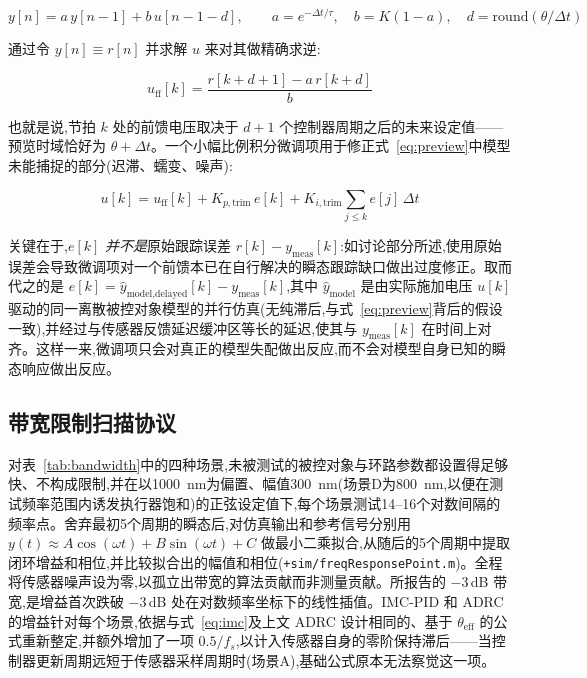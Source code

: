 \documentclass[fleqn,10pt]{wlscirep}
\begin{document}
\begin{equation}
y[n] = a\,y[n-1] + b\,u[n-1-d], \qquad a = e^{-\Delta t/\tau}, \quad b = K(1-a), \quad d = \mathrm{round}(\theta/\Delta t)
\end{equation}

通过令 $y[n] \equiv r[n]$ 并求解 $u$ 来对其做精确求逆:

\begin{equation}
u_\text{ff}[k] = \frac{r[k+d+1] - a\,r[k+d]}{b}
\label{eq:preview}
\end{equation}

也就是说,节拍 $k$ 处的前馈电压取决于 $d+1$ 个控制器周期之后的未来设定值——预览时域恰好为 $\theta + \Delta t$。一个小幅比例积分微调项用于修正式~\ref{eq:preview}中模型未能捕捉的部分(迟滞、蠕变、噪声):

\begin{equation}
u[k] = u_\text{ff}[k] + K_{p,\text{trim}}\,e[k] + K_{i,\text{trim}}\!\!\sum_{j\le k} e[j]\,\Delta t
\end{equation}

关键在于,$e[k]$ \emph{并不是}原始跟踪误差 $r[k]-y_\text{meas}[k]$:如讨论部分所述,使用原始误差会导致微调项对一个前馈本已在自行解决的瞬态跟踪缺口做出过度修正。取而代之的是 $e[k] = \hat{y}_\text{model,delayed}[k] - y_\text{meas}[k]$,其中 $\hat{y}_\text{model}$ 是由实际施加电压 $u[k]$ 驱动的同一离散被控对象模型的并行仿真(无纯滞后,与式~\ref{eq:preview}背后的假设一致),并经过与传感器反馈延迟缓冲区等长的延迟,使其与 $y_\text{meas}[k]$ 在时间上对齐。这样一来,微调项只会对真正的模型失配做出反应,而不会对模型自身已知的瞬态响应做出反应。

\subsection*{带宽限制扫描协议}

对表~\ref{tab:bandwidth}中的四种场景,未被测试的被控对象与环路参数都设置得足够快、不构成限制,并在以\SI{1000}{nm}为偏置、幅值\SI{300}{nm}(场景D为\SI{800}{nm},以便在测试频率范围内诱发执行器饱和)的正弦设定值下,每个场景测试14--16个对数间隔的频率点。舍弃最初5个周期的瞬态后,对仿真输出和参考信号分别用 $y(t) \approx A\cos(\omega t) + B\sin(\omega t) + C$ 做最小二乘拟合,从随后的5个周期中提取闭环增益和相位,并比较拟合出的幅值和相位(\texttt{+sim/freqResponsePoint.m})。全程将传感器噪声设为零,以孤立出带宽的算法贡献而非测量贡献。所报告的 $-3$\,dB 带宽,是增益首次跌破 $-3$\,dB 处在对数频率坐标下的线性插值。IMC-PID 和 ADRC 的增益针对每个场景,依据与式~\ref{eq:imc}及上文 ADRC 设计相同的、基于 $\theta_\text{eff}$ 的公式重新整定,并额外增加了一项 $0.5/f_s$,以计入传感器自身的零阶保持滞后——当控制器更新周期远短于传感器采样周期时(场景A),基础公式原本无法察觉这一项。
\end{document}

